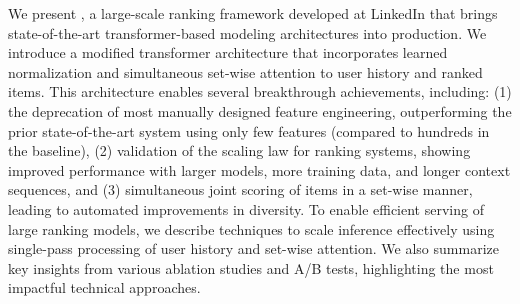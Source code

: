 We present {\systemname}, a large-scale ranking framework developed at LinkedIn that brings state-of-the-art transformer-based modeling architectures into production. We introduce a modified transformer architecture that incorporates learned normalization and simultaneous set-wise attention to user history and ranked items. This architecture enables several breakthrough achievements, including: (1) the deprecation of most manually designed feature engineering, outperforming the prior state-of-the-art system using only few features (compared to hundreds in the baseline), (2) validation of the scaling law for ranking systems, showing improved performance with larger models, more training data, and longer context sequences, and (3) simultaneous joint scoring of items in a set-wise manner, leading to automated improvements in diversity. 
To enable efficient serving of large ranking models, we describe techniques to scale inference effectively using single-pass processing of user history and set-wise attention. We also summarize key insights from various ablation studies and A/B tests, highlighting the most impactful technical approaches.